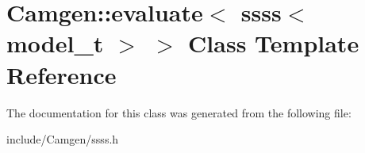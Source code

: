 \hypertarget{a00198}{}\section{Camgen\+:\+:evaluate$<$ ssss$<$ model\+\_\+t $>$ $>$ Class Template Reference}
\label{a00198}


The documentation for this class was generated from the following file\+:\begin{DoxyCompactItemize}
\item 
include/\+Camgen/ssss.\+h\end{DoxyCompactItemize}
